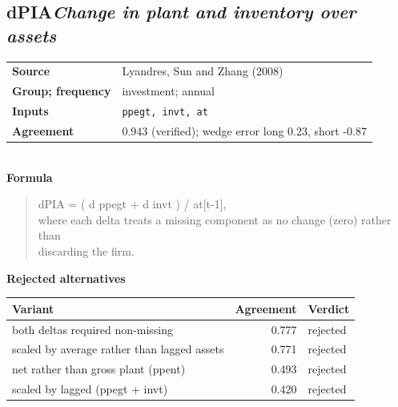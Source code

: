 \documentclass[11pt]{article}
\begin{document}
\subsection*{dPIA\quad\normalfont\itshape Change in plant and inventory over assets}
\begin{tabular}{@{}p{3.3cm}p{12.3cm}@{}}
\textbf{Source} & Lyandres, Sun and Zhang (2008)\\
\textbf{Group; frequency} & investment; annual\\
\textbf{Inputs} & \texttt{ppegt, invt, at}\\
\textbf{Agreement} & 0.943 (verified); wedge error long 0.23, short -0.87\\
\end{tabular}\\[4pt]
\textbf{Formula}
\begin{quote}\small
dPIA = ( d ppegt + d invt ) / at[t-1],\\
where each delta treats a missing component as no change (zero) rather than\\
discarding the firm.\\

\end{quote}
\textbf{Rejected alternatives}\\[2pt]
{\small\begin{longtable}{@{}p{9.6cm}rp{4.3cm}@{}}
\toprule Variant & Agreement & Verdict\\\midrule\endhead
both deltas required non-missing & 0.777 & rejected\\
scaled by average rather than lagged assets & 0.771 & rejected\\
net rather than gross plant (ppent) & 0.493 & rejected\\
scaled by lagged (ppegt + invt) & 0.420 & rejected\\
\bottomrule\end{longtable}}
\end{document}
